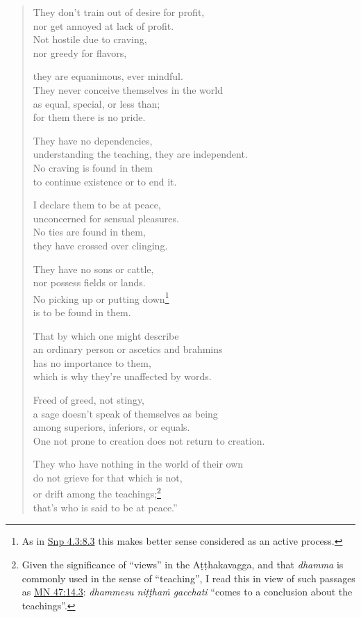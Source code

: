 \documentclass[12pt,openany]{book}%
\begin{document}
\begin{verse}
They don’t train out of desire for profit, \\
nor get annoyed at lack of profit. \\
Not hostile due to craving, \\
nor greedy for flavors, 

they are equanimous, ever mindful. \\
They never conceive themselves in the world \\
as equal, special, or less than; \\
for them there is no pride. 

They have no dependencies, \\
understanding the teaching, they are independent. \\
No craving is found in them \\
to continue existence or to end it. 

I declare them to be at peace, \\
unconcerned for sensual pleasures. \\
No ties are found in them, \\
they have crossed over clinging. 

They have no sons or cattle, \\
nor possess fields or lands. \\
No picking up or putting down\footnote{As in \href{https://suttacentral.net/snp4.3/en/sujato\#8.3}{Snp 4.3:8.3} this makes better sense considered as an active process. } \\
is to be found in them. 

That by which one might describe \\
an ordinary person or ascetics and brahmins \\
has no importance to them, \\
which is why they’re unaffected by words. 

Freed of greed, not stingy, \\
a sage doesn’t speak of themselves as being \\
among superiors, inferiors, or equals. \\
One not prone to creation does not return to creation. 

They who have nothing in the world of their own \\
do not grieve for that which is not, \\
or drift among the teachings;\footnote{Given the significance of “views” in the \textsanskrit{Aṭṭhakavagga}, and that \textit{dhamma} is commonly used in the sense of “teaching”, I read this in view of such passages as \href{https://suttacentral.net/mn47/en/sujato\#14.3}{MN 47:14.3}: \textit{dhammesu \textsanskrit{niṭṭhaṁ} gacchati} “comes to a conclusion about the teachings”. } \\
that’s who is said to be at peace.” 

%
\end{verse}
\end{document}
